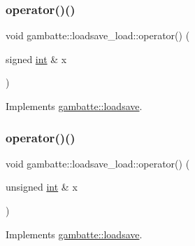 \subsubsection{\texorpdfstring{operator()()}{operator()()}\hspace{0.1cm}{\footnotesize\ttfamily [6/19]}}
{\footnotesize\ttfamily void gambatte\+::loadsave\+\_\+load\+::operator() (\begin{DoxyParamCaption}\item[{signed \hyperlink{ioapi_8h_a787fa3cf048117ba7123753c1e74fcd6}{int} \&}]{x }\end{DoxyParamCaption})\hspace{0.3cm}{\ttfamily [virtual]}}



Implements \hyperlink{classgambatte_1_1loadsave_a9a8e8765ac066a4d51099147f71595d1}{gambatte\+::loadsave}.

\mbox{\label{classgambatte_1_1loadsave__load_a19ccef4878489e15440e27c0f0614de5}} 
\subsubsection{\texorpdfstring{operator()()}{operator()()}\hspace{0.1cm}{\footnotesize\ttfamily [7/19]}}
{\footnotesize\ttfamily void gambatte\+::loadsave\+\_\+load\+::operator() (\begin{DoxyParamCaption}\item[{unsigned \hyperlink{ioapi_8h_a787fa3cf048117ba7123753c1e74fcd6}{int} \&}]{x }\end{DoxyParamCaption})\hspace{0.3cm}{\ttfamily [virtual]}}



Implements \hyperlink{classgambatte_1_1loadsave_a263bbb4b470594752ca94548673e66a4}{gambatte\+::loadsave}.

\mbox{\label{classgambatte_1_1loadsave__load_a8102bdbd866f6a0a05273496bed7ed90}} 
